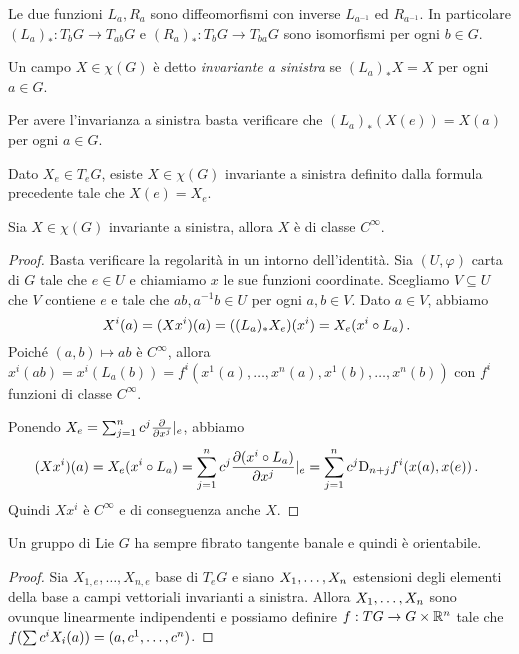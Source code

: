 Le due funzioni $L_a,R_a$ sono diffeomorfismi con inverse $L_{a^{-1}}$ ed $R_{a^{-1}}$.
In particolare $(L_a)_* : T_bG \to T_{ab} G$ e $(R_a)_* : T_bG \to T_{ba} G$ sono isomorfismi per ogni $b\in G$.


\begin{definition} 
	Un campo $X\in\chi(G)$ è detto \emph{invariante a sinistra} se $(L_a)_*X=X$ per ogni $a\in G$.
\end{definition}

\begin{remark}
	Per avere l'invarianza a sinistra basta verificare che $(L_a)_*(X(e)) = X(a)$ per ogni $a\in G$.
\end{remark}

Dato $X_e \in T_eG$, esiste $X\in\chi(G)$ invariante a sinistra definito dalla formula precedente tale che $X(e) = X_e$.


\begin{proposition}
	Sia $X \in \chi(G)$ invariante a sinistra, allora $X$ è di classe $C^\infty$.
\end{proposition}
\begin{proof}
	Basta verificare la regolarità in un intorno dell'identità. Sia $(U,\varphi)$ carta di $G$ tale che $e\in U$ e chiamiamo $x$ le sue funzioni coordinate. Scegliamo $V\subseteq U$ che $V$ contiene $e$ e tale che $a b, a^{-1}b \in U$ per ogni $a,b\in V$.
	Dato $a\in V$, abbiamo 
	\begin{equation*}
	X^i(a) = (Xx^i)(a) = ((L_a)_* X_e) (x^i) = X_e (x^i\circ L_a) \punto %
	\end{equation*}
	Poiché $(a,b) \mapsto ab$ è $C^\infty$, allora $x^i(ab) = x^i( L_a(b) ) = f^i(x^1(a),\ldots, x^n(a), x^1(b), \ldots, x^n(b) )$ con $f^i$ funzioni di classe $C^\infty$.
	
	Ponendo $X_e = \sum_{j=1}^n c^j \DerParz{}{x^j}\restrict e$, abbiamo
	\begin{equation*}
	(X x^i) (a) = X_e (x^i \circ L_a) = \sum_{j=1}^n c^j \DerParz{(x^i\circ L_a)}{x^j} \restrict e = 
	\sum_{j=1}^n c^j \Diff_{n+j} f^i(x(a), x(e))\punto
	\end{equation*}
	Quindi $Xx^i$ è $C^\infty$ e di conseguenza anche $X$.
\end{proof}

\begin{corollary}
	Un gruppo di Lie $G$ ha sempre fibrato tangente banale e quindi è orientabile.
\end{corollary}
\begin{proof}
	Sia $X_{1,e},\ldots,X_{n,e}$ base di $T_eG$ e siano $\seqb Xn,$ estensioni degli elementi della base a campi vettoriali invarianti a sinistra. Allora $\seqb Xn,$ sono ovunque linearmente indipendenti e possiamo definire $f:TG \to G\times \R^n$ tale che $f(\sum c^iX_i(a)) = (a,\seqa cn,)$.
\end{proof}

